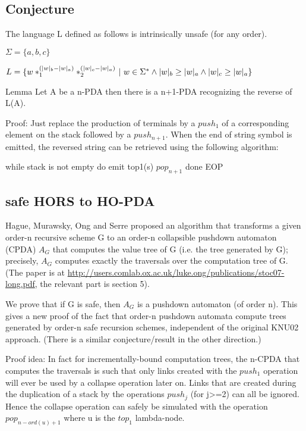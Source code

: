 \documentclass{article}
\begin{document}
\subsection{Conjecture}
The language L defined as follows is intrinsically unsafe (for any order).

$\Sigma = \{ a, b, c \}$

$L = \{ w *_1^{(|w|_b - |w|_a)} *_2^{(|w|_c - |w|_a)} \ | \
   w \in \Sigma^* \wedge |w|_b \geq |w|_a \wedge |w|_c \geq |w|_a \}$




Lemma Let A be a n-PDA then there is a n+1-PDA recognizing
the reverse of L(A).

Proof: Just replace the production of terminals by a $push_1$
of a corresponding element on the stack followed by a $push_{n+1}$.
When the end of string symbol is emitted, the reversed string can be
retrieved using the following algorithm:

    while stack is not empty do
       emit top1(s)
       $pop_{n+1}$
    done
EOP





\subsection{safe HORS to HO-PDA}

Hague, Murawsky, Ong and Serre proposed an algorithm that transforms a
given order-n recursive scheme G to an order-n collapsible pushdown
 automaton (CPDA) $A_G$ that computes the value tree of G (i.e. the tree
 generated by G); precisely, $A_G$ computes exactly the traversals over the
 computation tree of G. (The paper is at
\url{http://users.comlab.ox.ac.uk/luke.ong/publications/stoc07-long.pdf},
the relevant part is section 5).

We prove that if G is safe, then $A_G$ is a pushdown automaton
 (of order n). This gives a new proof of the fact that order-n pushdown automata compute
 trees generated by order-n safe recursion schemes, independent of the
 original KNU02 approach. (There is a similar conjecture/result in the
 other direction.)


Proof idea:
In fact for incrementally-bound computation trees,
the n-CPDA that computes the traversals is  such that only links created with the $push_1$
operation will ever be used by a collapse operation later on.
Links that are created during the duplication of a stack by the
operations $push_j$ (for j>=2) can all be ignored. Hence the
collapse operation can safely be simulated with the operation
$pop_{n-ord(u)+1}$ where u is the $top_1$ lambda-node.
\end{document}
